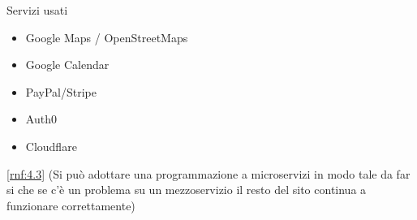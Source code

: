 \documentclass{article}
\begin{document}

\pagebreak

\tableofcontents
\pagebreak










Servizi usati
\begin{itemize}
    \item Google Maps / OpenStreetMaps
    \item Google Calendar
    \item PayPal/Stripe
    \item Auth0
    \item Cloudflare
\end{itemize}

\ref{rnf:4.3} (Si può adottare una programmazione a microservizi in modo tale da far si che se c'è un problema su un mezzoservizio il resto del sito continua a funzionare correttamente)
\end{document}
